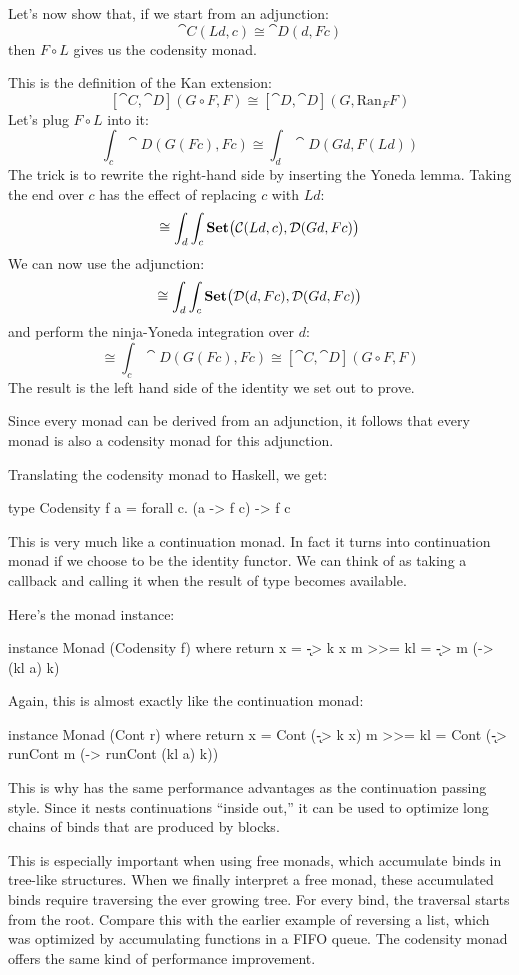 \documentclass[DaoFP]{subfiles}
\begin{document}
Let's now show that, if we start from an adjunction:
\[ \cat C(L d, c) \cong \cat D (d, F c) \]
then $F \circ L$ gives us the codensity monad.

This is the definition of the Kan extension:
\[ [\cat C, \cat D](G \circ F, F) \cong  [\cat D, \cat D] (G, \text{Ran}_F F)\]
Let's plug $F \circ L$ into it:
\[ \int_c \cat D( G (F c), F c) \cong \int_d \cat D (G d, F (L d)) \]
The trick is to rewrite the right-hand side by inserting the Yoneda lemma. Taking the end over $c$ has the effect of replacing $c$ with $L d$:
\[ \cong \int_d \int_c \mathbf{Set}\big(\mathcal{C}(L d, c), \mathcal{D} (G d, F c)\big) \]
We can now use the adjunction:
\[ \cong \int_d \int_c \mathbf{Set}\big(\mathcal{D}(d, F c), \mathcal{D} (G d, F c)\big) \]
and perform the ninja-Yoneda integration over $d$:
\[ \cong \int_c \cat D (G (F c), F c) \cong [\cat C, \cat D](G \circ F, F) \]
The result is the left hand side of the identity we set out to prove.

Since every monad can be derived from an adjunction, it follows that every monad is also a codensity monad for this adjunction.

Translating the codensity monad to Haskell, we get:
 \begin{haskell}
type Codensity f a = forall c. (a -> f c) -> f c
 \end{haskell}
This is very much like a continuation monad. In fact it turns into continuation monad if we choose  to be the identity functor. We can think of  as taking a callback  and calling it when the result of type  becomes available. 

Here's the monad instance:
 \begin{haskell}
instance Monad (Codensity f) where
  return x = \k -> k x
  m >>= kl = \k -> m (\a -> (kl a) k)
 \end{haskell}
 Again, this is almost exactly like the continuation monad:
 \begin{haskell}
instance Monad (Cont r) where
  return x = Cont (\k -> k x)
  m >>= kl = Cont (\k -> runCont m (\a -> runCont (kl a) k))
\end{haskell}
This is why  has the same performance advantages as the continuation passing style. Since it nests continuations ``inside out,'' it can be used to optimize long chains of binds that are produced by  blocks. 

This is especially important when using free monads, which accumulate binds in tree-like structures. When we finally interpret a free monad, these accumulated binds require traversing the ever growing tree. For every bind, the traversal starts from the root. Compare this with the earlier example of reversing a list, which was optimized by accumulating functions in a FIFO queue. The codensity monad offers the same kind of performance improvement.
\end{document}
